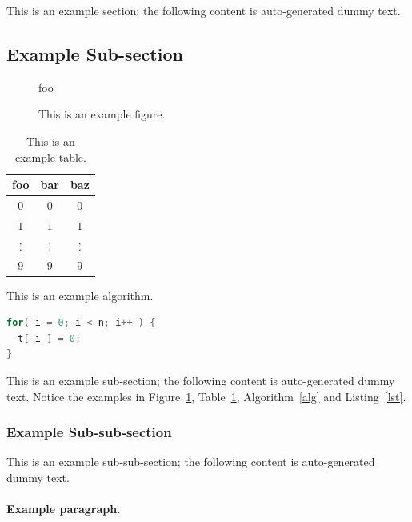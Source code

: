 \documentclass[ %
                    author={Manan Vaswani},
                supervisor={Dr. Raphael Clifford},
                    degree={MEng},
                     title={A multi-core CPU implementation \n of the classical Boson Sampling algorithm},
                  subtitle={},
                      type={},
                      year={2019} ]{dissertation}
\begin{document}
This is an example section; 
the following content is auto-generated dummy text.
\lipsum

\subsection{Example Sub-section}

\begin{figure}[t]
\centering
foo
\caption{This is an example figure.}
\label{fig}
\end{figure}

\begin{table}[t]
\centering
\begin{tabular}{|cc|c|}
\hline
foo      & bar      & baz      \\
\hline
$0     $ & $0     $ & $0     $ \\
$1     $ & $1     $ & $1     $ \\
$\vdots$ & $\vdots$ & $\vdots$ \\
$9     $ & $9     $ & $9     $ \\
\hline
\end{tabular}
\caption{This is an example table.}
\label{tab}
\end{table}

\begin{algorithm}[t]
\caption{This is an example algorithm.}
\label{alg}
\end{algorithm}

\begin{lstlisting}[float={t},caption={This is an example listing.},label={lst},language=C]
for( i = 0; i < n; i++ ) {
  t[ i ] = 0;
}
\end{lstlisting}

This is an example sub-section;
the following content is auto-generated dummy text.
Notice the examples in Figure~\ref{fig}, Table~\ref{tab}, Algorithm~\ref{alg}
and Listing~\ref{lst}.
\lipsum

\subsubsection{Example Sub-sub-section}

This is an example sub-sub-section;
the following content is auto-generated dummy text.
\lipsum

\paragraph{Example paragraph.}
\end{document}
